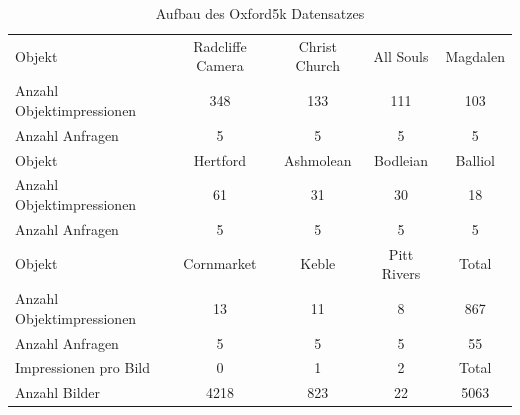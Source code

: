 \begin{table}[h]
\centering
\begin{tabular}{l|c|c|c|c}
\rowcolor[HTML]{C0C0C0} 
Objekt                 & Radcliffe Camera & Christ Church & All Souls   & Magdalen \\
Anzahl Objektimpressionen & 348              & 133           & 111         & 103      \\
Anzahl Anfragen           & 5                & 5             & 5           & 5        \\ \hline
\rowcolor[HTML]{C0C0C0} 
Objekt                & Hertford         & Ashmolean     & Bodleian    & Balliol  \\
Anzahl Objektimpressionen & 61               & 31            & 30          & 18       \\
Anzahl Anfragen           & 5                & 5             & 5           & 5        \\ \hline
\rowcolor[HTML]{C0C0C0} 
Objekt                 & Cornmarket       & Keble         & Pitt Rivers & Total    \\
Anzahl Objektimpressionen & 13               & 11            & 8           & 867      \\
Anzahl Anfragen           & 5                & 5             & 5           & 55       \\ \hline
\rowcolor[HTML]{C0C0C0} 
Impressionen pro Bild     & 0                & 1             & 2           & Total    \\
Anzahl Bilder             & 4218             & 823           & 22          & 5063    
\end{tabular}%
\caption{Aufbau des Oxford5k Datensatzes}
\label{oxford5k_data}
\end{table}


